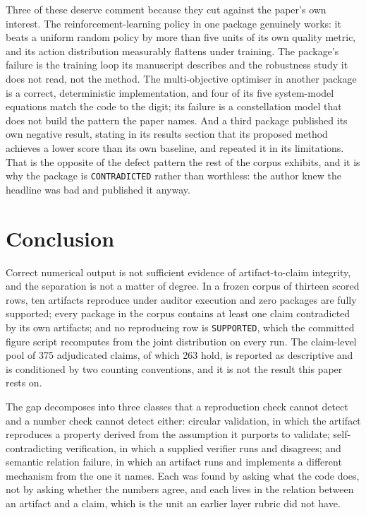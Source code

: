 \documentclass[sigconf,review]{acmart}
\begin{document}
Three of these deserve comment because they cut against the paper's own
interest. The reinforcement-learning policy in one package genuinely works:
it beats a uniform random policy by more than five units of its own quality
metric, and its action distribution measurably flattens under training. The
package's failure is the training loop its manuscript describes and the
robustness study it does not read, not the method. The multi-objective
optimiser in another package is a correct, deterministic implementation, and
four of its five system-model equations match the code to the digit; its
failure is a constellation model that does not build the pattern the paper
names. And a third package published its own negative result, stating in its
results section that its proposed method achieves a lower score than its own
baseline, and repeated it in its limitations. That is the opposite of the
defect pattern the rest of the corpus exhibits, and it is why the package is
\texttt{CONTRADICTED} rather than worthless: the author knew the headline was
bad and published it anyway.

\section{Conclusion}
\label{sec:conclusion}

Correct numerical output is not sufficient evidence of artifact-to-claim
integrity, and the separation is not a matter of degree. In a frozen corpus
of thirteen scored rows, ten artifacts reproduce under auditor execution and
zero packages are fully supported; every package in the corpus contains at
least one claim contradicted by its own artifacts; and no reproducing row is
\texttt{SUPPORTED}, which the committed figure script recomputes from the joint
distribution on every run. The claim-level pool of 375 adjudicated
claims, of which 263 hold, is reported as descriptive and is conditioned by
two counting conventions, and it is not the result this paper rests on.

The gap decomposes into three classes that a reproduction check cannot detect
and a number check cannot detect either: circular validation, in which the
artifact reproduces a property derived from the assumption it purports to
validate; self-contradicting verification, in which a supplied verifier runs
and disagrees; and semantic relation failure, in which an artifact runs and
implements a different mechanism from the one it names. Each was found by
asking what the code does, not by asking whether the numbers agree, and each
lives in the relation between an artifact and a claim, which is the unit an
earlier layer rubric did not have.
\end{document}
